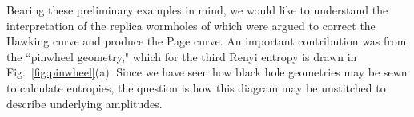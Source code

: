 \documentclass[11pt]{article}
\numberwithin{equation}{section}
\begin{document}
Bearing these preliminary examples in mind, we would like to understand the interpretation of the replica wormholes of \cite{Penington:2019kki, Almheiri:2019qdq} which were argued to correct the Hawking curve and produce the Page curve.  An important contribution was from the ``pinwheel geometry," which for the third Renyi entropy is drawn in Fig.~\ref{fig:pinwheel}(a).  Since we have seen how black hole geometries may be sewn to calculate entropies, the question is how this diagram may be unstitched to describe underlying amplitudes.


\begin{figure}[h!]
\begin{center}
   \hspace{1cm}
\end{center}
\end{figure}
\end{document}
